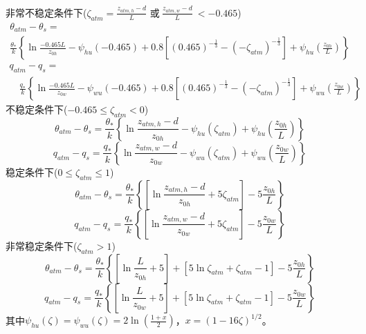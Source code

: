 \noindent 非常不稳定条件下($\zeta_{atm}=\frac{z_{atm,h}-d}{L}$ 或$ \ \frac{z_{atm,w}-d}{L}\ <-0.465$)
\begin{equation}\label{theta_VU}
\begin{array}{l}\theta_{atm}-\theta_{s}= \\ 
     \frac{\theta_{*}}{k}\left\{\ln \frac{-0.465 L}{z_{0 h}}-\psi_{hu}(-0.465)+0.8\left[(0.465)^{-\frac{1}{3}}-\left(-\zeta_{atm}\right)^{-\frac{1}{3}}\right]
     +\psi_{hu}\left(\frac{z_{0 h}}{L}\right)\right\}\end{array}
\end{equation}
\begin{equation}\label{q_VU}
\begin{array}{l}q_{atm}-q_{s}= \\ 
     \quad \frac{q_{*}}{k}\left\{\ln \frac{-0.465 L}{z_{0 w}}-\psi_{wu}(-0.465)+0.8\left[(0.465)^{-\frac{1}{3}}-
     \left(-\zeta_{atm}\right)^{-\frac{1}{3}}\right]+\psi_{wu}\left(\frac{z_{0 w}}{L}\right)\right\}\end{array}
\end{equation}
不稳定条件下($-0.465\le\zeta_{atm}<0$)
\begin{equation}
\theta_{atm}-\theta_{s}=\frac{\theta_{*}}{k}\left\{\ln \frac{z_{atm, h}-d}{z_{0 h}}-\psi_{hu}
\left(\zeta_{atm}\right)+\psi_{hu}\left(\frac{z_{0 h}}{L}\right)\right\}
\end{equation}
\begin{equation}
q_{atm}-q_{s}=\frac{q_{*}}{k}\left\{\ln \frac{z_{atm, w}-d}{z_{0 w}}-
\psi_{wu}\left(\zeta_{atm}\right)+\psi_{wu}\left(\frac{z_{0 w}}{L}\right)\right\}
\end{equation}
稳定条件下($0\le\zeta_{atm}\le1$)
\begin{equation}
\theta_{atm}-\theta_{s}=\frac{\theta_{*}}{k}\left\{\left[\ln \frac{z_{atm, h}-d}{z_{0 h}}+5 \zeta_{atm}\right]-5 \frac{z_{0 h}}{L}\right\}
\end{equation}
\begin{equation}
q_{atm}-q_{s}=\frac{q_{*}}{k}\left\{\left[\ln \frac{z_{atm, w}-d}{z_{0 w}}+5 \zeta_{atm}\right]-5 \frac{z_{0 w}}{L}\right\}
\end{equation}
非常稳定条件下($\zeta_{atm}>1$)
\begin{equation}\label{theta_VS}
\theta_{atm}-\theta_{s}=\frac{\theta_{*}}{k}\left\{\left[\ln \frac{L}{z_{0 h}}+5\right]
+\left[5 \ln \zeta_{atm}+\zeta_{atm}-1\right]-5 \frac{z_{0 h}}{L}\right\}
\end{equation}
\begin{equation}\label{q_VS}
q_{atm}-q_{s}=\frac{q_{*}}{k}\left\{\left[\ln \frac{L}{z_{0 w}}+5\right]
+\left[5 \ln \zeta_{atm}+\zeta_{atm}-1\right]-5 \frac{z_{0 w}}{L}\right\}
\end{equation}
其中$\psi_{hu}\left(\zeta\right)=\psi_{wu}\left(\zeta\right)=2\ln{\left(\frac{1+x}{2}\right)}$，$x={(1-16\zeta)}^{1/2}$。

